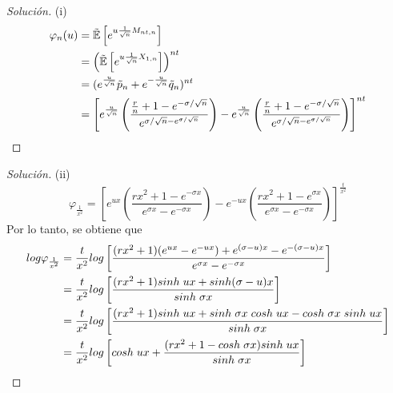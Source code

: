 \documentclass[11pt,notitlepage]{article}
\newenvironment{solucion}
  {\begin{proof}[Solución]}
  {\end{proof}}
\begin{document}
\begin{solucion}
 (i)
 \begin{align*}
    \varphi_{n}(u)&=\Tilde{\mathbb{E}}\left[e^{u\frac{1}{\sqrt{n}}M_{nt,n}} \right]\\
    &=\left( \Tilde{\mathbb{E}}\left[e^{u\frac{1}{\sqrt{n}}X_{1,n}} \right]\right)^{nt}\\
    &=(e^{\frac{u}{\sqrt{n}}}\Tilde{p}_{n}+e^{-\frac{u}{\sqrt{n}}}\Tilde{q}_{n})^{nt}\\
    &=\left[ e^{\frac{u}{\sqrt{n}}}\left(\frac{\frac{r}{n}+1-e^{-\sigma/\sqrt{n}}}{e^{\sigma/\sqrt{n}-e^{\sigma/\sqrt{n}}}} \right) -e^{\frac{u}{\sqrt{n}}}\left( \frac{\frac{r}{n}+1-e^{-\sigma/\sqrt{n}}}{e^{\sigma/\sqrt{n}-e^{\sigma/\sqrt{n}}}} \right) \right]^{nt}
 \end{align*}
\end{solucion}
\begin{solucion}
 (ii)
 \begin{equation*}
     \varphi_{\frac{1}{x^2}}=\left[ e^{ux}\left(\frac{rx^2+1-e^{-\sigma x}}{e^{\sigma x}-e^{-\sigma x}} \right)-e^{-ux}\left(\frac{rx^2+1-e^{\sigma x}}{e^{\sigma x}-e^{-\sigma x}} \right)\right]^{\frac{t}{x^2}}
 \end{equation*}
 \hspace{0.4cm} Por lo tanto, se obtiene que
 \begin{align*}
     log\varphi_{\frac{1}{x^2}}&=\frac{t}{x^2}log\left[ \frac{(rx^2+1)(e^{ux}-e^{-ux})+e^{(\sigma-u)x}-e^{-(\sigma-u)x}}{e^{\sigma x}-e^{-\sigma x}}\right]\\
     &=\frac{t}{x^2}log\left[ \frac{(rx^2+1)sinh\hspace{0.1cm}ux+sinh(\sigma -u)x}{sinh\hspace{0.1cm}\sigma x}\right]\\
     &=\frac{t}{x^2}log\left[ \frac{(rx^2+1)sinh\hspace{0.1cm}ux+sinh\hspace{0.1cm}\sigma x\hspace{0.1cm}cosh\hspace{0.1cm}ux-cosh\hspace{0.1cm}\sigma x\hspace{0.1cm}sinh\hspace{0.1cm}ux}{sinh\hspace{0.1cm}\sigma x}\right]\\
     &=\frac{t}{x^2}log\left[ cosh\hspace{0.1cm}ux+\frac{(rx^2+1-cosh\hspace{0.1cm}\sigma x)sinh\hspace{0.1cm}ux}{sinh\hspace{0.1cm}\sigma x}\right]
 \end{align*}
\end{solucion}
\end{document}
